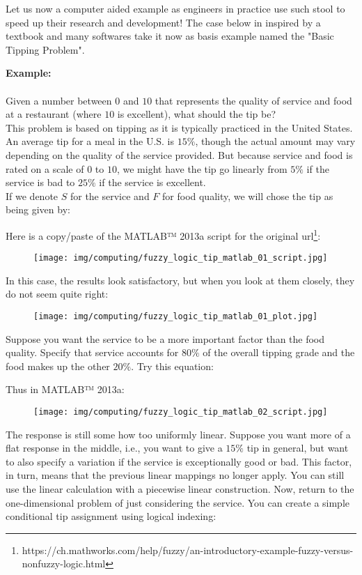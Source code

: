 	Let us now a computer aided example as engineers in practice use such stool to speed up their research and development! The case below in inspired by a textbook and many softwares take it now as basis example named the "Basic Tipping Problem". 
	\begin{tcolorbox}[colframe=black,colback=white,sharp corners]
	\textbf{{\Large {}}Example:}\\\\
	Given a number between $0$ and $10$ that represents the quality of service and food at a restaurant (where $10$ is excellent), what should the tip be? \\
	
	This problem is based on tipping as it is typically practiced in the United States. An average tip for a meal in the U.S. is $15\%$, though the actual amount may vary depending on the quality of the service provided. But because service and food is rated on a scale of $0$ to $10$, we might have the tip go linearly from $5\%$ if the service is bad to $25\%$ if the service is excellent.\\
	
	If we denote $S$ for the service and $F$ for food quality, we will chose the tip as being given by:
	
	Here is a copy/paste of the MATLAB™ 2013a script for the original url\footnote{https://ch.mathworks.com/help/fuzzy/an-introductory-example-fuzzy-versus-nonfuzzy-logic.html}:
	\begin{figure}[H]
		\centering
		\texttt{[image: img/computing/fuzzy\_logic\_tip\_matlab\_01\_script.jpg]}
	\end{figure}
	
	\end{tcolorbox}
	
	\begin{tcolorbox}[colframe=black,colback=white,sharp corners]
	In this case, the results look satisfactory, but when you look at them closely, they do not seem quite right:
	\begin{figure}[H]
		\centering
		\texttt{[image: img/computing/fuzzy\_logic\_tip\_matlab\_01\_plot.jpg]}
	\end{figure}
	Suppose you want the service to be a more important factor than the food quality. Specify that service accounts for $80\%$ of the overall tipping grade and the food makes up the other $20\%$. Try this equation:
	
	Thus in MATLAB™ 2013a:
	\begin{figure}[H]
		\centering
		\texttt{[image: img/computing/fuzzy\_logic\_tip\_matlab\_02\_script.jpg]}
	\end{figure}
	The response is still some how too uniformly linear. Suppose you want more of a flat response in the middle, i.e., you want to give a $15\%$ tip in general, but want to also specify a variation if the service is exceptionally good or bad. This factor, in turn, means that the previous linear mappings no longer apply. You can still use the linear calculation with a piecewise linear construction. Now, return to the one-dimensional problem of just considering the service. You can create a simple conditional tip assignment using logical indexing:
	\end{tcolorbox}
	

